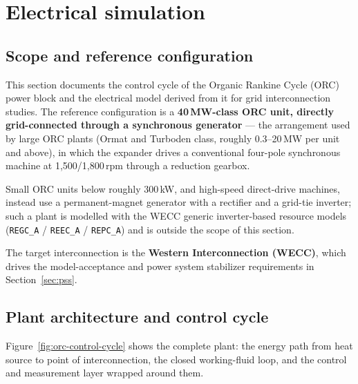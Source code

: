\section{Electrical simulation}

\subsection{Scope and reference configuration}
This section documents the control cycle of the Organic Rankine Cycle (ORC)
power block and the electrical model derived from it for grid interconnection
studies. The reference configuration is a \textbf{40\,MW-class ORC unit,
directly grid-connected through a synchronous generator} --- the arrangement
used by large ORC plants (Ormat and Turboden class, roughly 0.3--20\,MW per
unit and above), in which the expander drives a conventional four-pole
synchronous machine at 1{,}500/1{,}800\,rpm through a reduction gearbox.

Small ORC units below roughly 300\,kW, and high-speed direct-drive machines,
instead use a permanent-magnet generator with a rectifier and a grid-tie
inverter; such a plant is modelled with the WECC generic inverter-based
resource models (\texttt{REGC\_A} / \texttt{REEC\_A} / \texttt{REPC\_A}) and is
outside the scope of this section.

The target interconnection is the \textbf{Western Interconnection (WECC)}, which
drives the model-acceptance and power system stabilizer requirements in
Section~\ref{sec:pss}.

\subsection{Plant architecture and control cycle}
Figure~\ref{fig:orc-control-cycle} shows the complete plant: the energy path
from heat source to point of interconnection, the closed working-fluid loop,
and the control and measurement layer wrapped around them.

